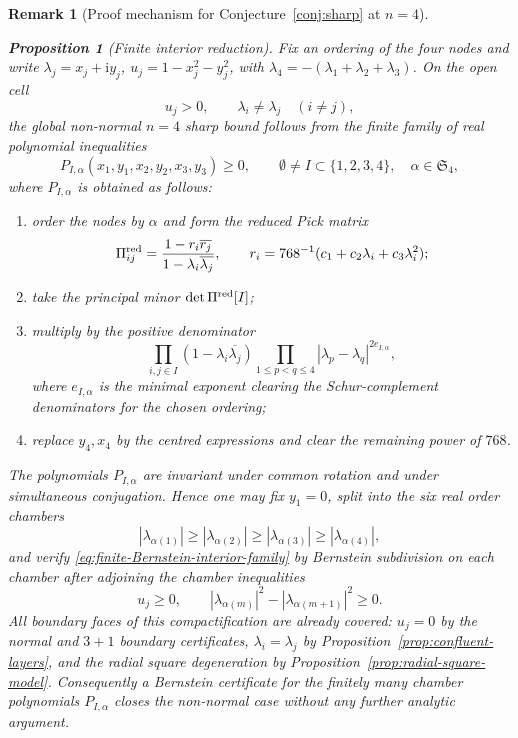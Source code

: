 \documentclass[11pt]{article}
\newtheorem{proposition}[theorem]{Proposition}
\newtheorem{remark}[theorem]{Remark}
\numberwithin{equation}{section}
\newcommand{\ii}{\mathrm i}
\begin{document}
\begin{remark}[Proof mechanism for Conjecture~\ref{conj:sharp} at $n=4$]
\begin{proposition}[Finite interior reduction]\label{prop:finite-interior-reduction}
Fix an ordering of the four nodes and write
\(\lambda_j=x_j+\ii y_j\), \(u_j=1-x_j^2-y_j^2\), with
\(\lambda_4=-(\lambda_1+\lambda_2+\lambda_3)\).  On the open cell
\[
  u_j>0,\qquad \lambda_i\ne\lambda_j\quad(i\ne j),
\]
the global non-normal \(n=4\) sharp bound follows from the finite family of
real polynomial inequalities
\begin{equation}\label{eq:finite-Bernstein-interior-family}
  P_{I,\alpha}(x_1,y_1,x_2,y_2,x_3,y_3)\ge0,
  \qquad
  \emptyset\ne I\subset\{1,2,3,4\},\quad
  \alpha\in\mathfrak S_4 ,
\end{equation}
where \(P_{I,\alpha}\) is obtained as follows:
\begin{enumerate}
\item order the nodes by \(\alpha\) and form the reduced Pick matrix
\[
  \Pi^{\rm red}_{ij}=
  \frac{1-r_i\overline{r_j}}{1-\lambda_i\overline{\lambda_j}},
  \qquad
  r_i=768^{-1}(c_1+c_2\lambda_i+c_3\lambda_i^2);
\]
\item take the principal minor \(\det \Pi^{\rm red}[I]\);
\item multiply by the positive denominator
\[
  \prod_{i,j\in I}(1-\lambda_i\overline{\lambda_j})
  \prod_{1\le p<q\le4}|\lambda_p-\lambda_q|^{2e_{I,\alpha}},
\]
where \(e_{I,\alpha}\) is the minimal exponent clearing the Schur-complement
denominators for the chosen ordering;
\item replace \(y_4,x_4\) by the centred expressions and clear the remaining
power of \(768\).
\end{enumerate}
The polynomials \(P_{I,\alpha}\) are invariant under common rotation and under
simultaneous conjugation.  Hence one may fix \(y_1=0\), split into the six
real order chambers
\[
  |\lambda_{\alpha(1)}|\ge|\lambda_{\alpha(2)}|\ge
  |\lambda_{\alpha(3)}|\ge|\lambda_{\alpha(4)}|,
\]
and verify \eqref{eq:finite-Bernstein-interior-family} by Bernstein
subdivision on each chamber after adjoining the chamber inequalities
\[
  u_j\ge0,\qquad
  |\lambda_{\alpha(m)}|^2-|\lambda_{\alpha(m+1)}|^2\ge0 .
\]
All boundary faces of this compactification are already covered:
\(u_j=0\) by the normal and \(3{+}1\) boundary certificates,
\(\lambda_i=\lambda_j\) by Proposition~\ref{prop:confluent-layers}, and the
radial square degeneration by Proposition~\ref{prop:radial-square-model}.
Consequently a Bernstein certificate for the finitely many chamber polynomials
\(P_{I,\alpha}\) closes the non-normal case without any further analytic
argument.
\end{proposition}


\end{remark}
\end{document}
